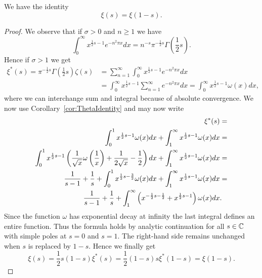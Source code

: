 \begin{proposition}\label{pro:XiIdentity}
	We have the identity
\begin{equation*}
	\xi(s) = \xi(1 - s).
\end{equation*}
\end{proposition}
\begin{proof}
	We observe that if $\sigma > 0$ and $n \geq 1$ we have
\begin{equation*}
	\int _0 ^\infty x^{\frac{1}{2} s - 1} e^{-n^2 \pi x} dx = n^{-s} \pi^{-\frac{1}{2}s}\Gamma(\frac{1}{2}s).
\end{equation*}
	Hence if $\sigma > 1$ we get
\begin{equation*}
\begin{aligned}
	\xi^*(s) = \pi^{-\frac{1}{2}s} \Gamma(\frac{1}{2}s) \zeta(s) 
		&= \sum _{n = 1} ^\infty \int _0 ^\infty x^{\frac{1}{2} s - 1} e^{-n^2 \pi x} dx \\
		&= \int _0 ^\infty x^{\frac{1}{2} s - 1} \sum _{n = 1} ^\infty e^{-n^2 \pi x} dx
		= \int _0 ^\infty x^{\frac{1}{2} s - 1} \omega(x) dx,
\end{aligned}
\end{equation*}
	where we can interchange sum and integral because of absolute convergence. We now use Corollary~\ref{cor:ThetaIdentity} and may now write
\begin{equation*}
\begin{aligned}	
	\xi^*(s) &= \\
		\int _0 ^1 x^{\frac{1}{2} s - 1} \omega(x) dx  + \int _1 ^\infty x^{\frac{1}{2} s - 1} \omega(x) dx &= \\
		\int _0 ^1 x^{\frac{1}{2} s - 1} \left(\frac{1}{\sqrt{x}} \omega\left(\frac{1}{x}\right) + \frac{1}{2\sqrt{x}} - \frac{1}{2}\right) dx  + \int _1 ^\infty x^{\frac{1}{2} s - 1} \omega(x) dx &= \\
		\frac{1}{s - 1} + \frac{1}{s} + \int _0 ^1 x^{\frac{1}{2} s - \frac{3}{2}} \omega(x) dx + \int _1 ^\infty x^{\frac{1}{2} s - 1} \omega(x) dx &= \\
		\frac{1}{s - 1} + \frac{1}{s} + \int _1 ^\infty \left(x^{-\frac{1}{2} s - \frac{1}{2}} + x^{\frac{1}{2} s - 1}\right) \omega(x) dx &.
\end{aligned}
\end{equation*}
	Since the function $\omega$ has exponential decay at infinity the last integral defines an entire function. Thus the formula holds by analytic continuation for all $s \in \mathbb{C}$ with simple poles at $s = 0$ and $s = 1$. The right-hand side remains unchanged when $s$ is replaced by $1 - s$. Hence we finally get
\begin{equation*}
	\xi(s) = \frac{1}{2}s(1 - s) \xi^*(s) = \frac{1}{2}(1 - s)s \xi^*(1 - s) = \xi(1 - s).
\end{equation*}
\end{proof}


